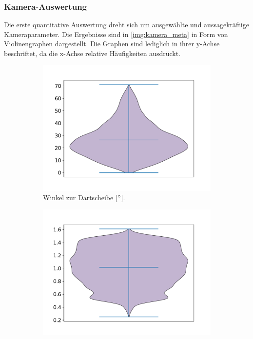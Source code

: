 \subsubsection{Kamera-Auswertung}
\label{sec:kamera_ergebnisse}

Die erste quantitative Auswertung dreht sich um ausgewählte und aussagekräftige Kameraparameter. Die Ergebnisse sind in \autoref{img:kamera_meta} in Form von Violinengraphen dargestellt. Die Graphen sind lediglich in ihrer y-Achse beschriftet, da die x-Achse relative Häufigkeiten ausdrückt.

\begin{figure}
    \centering
    \begin{subfigure}[b]{0.475\textwidth}
        \centering
        \includegraphics[width=\textwidth]{imgs/rendering/ergebnisse/cam_angles.pdf}
        \caption{Winkel zur Dartscheibe [$^{\circ}$].}
        \label{fig:cam_angle}
    \end{subfigure}
    \hfill
    \begin{subfigure}{0.475\textwidth}
        \centering
        \includegraphics[width=\textwidth]{imgs/rendering/ergebnisse/cam_dists.pdf}

\end{subfigure}
\end{figure}
